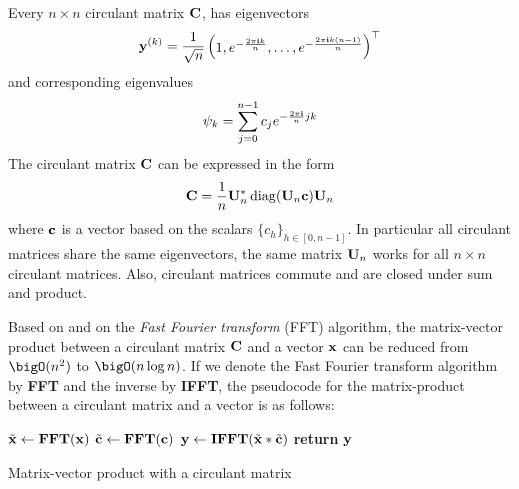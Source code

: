 \begin{theorem} \label{theorem:ch2-diagonalization_circulant_matrix}
  Every $n \times n$ circulant matrix $\mathbf{C}$, has eigenvectors  
  \begin{equation}
    \mathbf{y}^{(k)} = \frac{1}{\sqrt{n}} \begin{pmatrix} 1, e^{-\frac{2 \pi \mathbf{i} k}{n}}, \dots, e^{-\frac{2 \pi \mathbf{i} k(n-1)}{n}} \end{pmatrix}^\top
  \end{equation}
  and corresponding eigenvalues
  \begin{equation}
    \psi_k = \sum_{j=0}^{n-1} c_j e^{-\frac{2 \pi \mathbf{i}}{n} jk}
  \end{equation}
  The circulant matrix $\mathbf{C}$ can be expressed in the form 
  \begin{equation} \label{equation:ch2-diagonalization_circulant_matrix}
    \mathbf{C} = \frac{1}{n} \mathbf{U}_n^* \operatorname*{diag}(\mathbf{U}_n \mathbf{c}) \mathbf{U}_n
  \end{equation}
  where $\mathbf{c}$ is a vector based on the scalars $\{c_h\}_{h \in [0,n-1]}$.
  In particular all circulant matrices share the same eigenvectors, the same matrix $\mathbf{U}_n$ works for all $n \times n$ circulant matrices.
  Also, circulant matrices commute and are closed under sum and product.
\end{theorem}
\noindent
Based on  and on the \emph{Fast Fourier transform} (FFT) algorithm, the matrix-vector product between a circulant matrix $\mathbf{C}$ and a vector $\mathbf{x}$ can be reduced from $\bigO(n^2)$ to $\bigO(n \log n)$. 
If we denote the Fast Fourier transform algorithm by \textbf{FFT} and the inverse by \textbf{IFFT}, the pseudocode for the matrix-product between a circulant matrix and a vector is as follows:
\begin{algorithm}[h]
  \begin{algorithmic}[1]
     
      \State $\tilde{\mathbf{x}} \gets \textbf{FFT}(\mathbf{x})$
      \State $\tilde{\mathbf{c}} \gets \textbf{FFT}(\mathbf{c})$
      \State $\mathbf{y} \gets \textbf{IFFT}(\tilde{\mathbf{x}} * \tilde{\mathbf{c}})$ 
      \State \textbf{return} $\mathbf{y}$ 
    \EndProcedure
  \end{algorithmic}
  \caption{Matrix-vector product with a circulant matrix}
  \label{algorithm:ch2-matrix_vector_product_circulant_matrix}
\end{algorithm}

